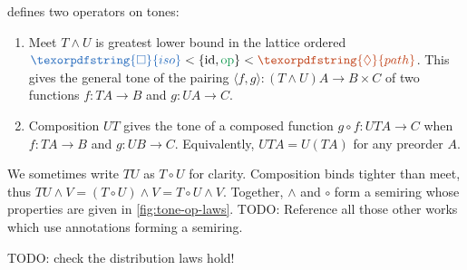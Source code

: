 \documentclass[ribbons]{rntz}
\newcommand{\todo}[1]{{\color{Purple}#1}}
\newcommand{\id}{\ensuremath{\textrm{id}}}
\newcommand{\op}{\ensuremath{\textrm{op}}}
\newcommand{\iso}{\ensuremath{\textrm{iso}}}     %
\renewcommand{\path}{\ensuremath{\textrm{path}}} %
\renewcommand{\iso}{\texorpdfstring{\ensuremath{\Box}}{iso}}
\renewcommand{\path}{\texorpdfstring{\ensuremath{\lozenge}}{path}}
\newcommand{\toneof}[2]{#1 #2}
\newcommand{\tc}{\circ}                      %
\newcommand{\tmeet}{\wedge}                  %
\newcommand{\tm}{\id}                        %
\newcommand{\ta}{{\color{ForestGreen}\op}}   %
\newcommand{\ti}{{\color{NavyBlue}\iso}}     %
\newcommand{\tb}{{\color{Bittersweet}\path}} %
\begin{document}
 defines two operators on tones:
\begin{enumerate}
\item Meet $T \tmeet U$ is greatest lower bound in the lattice ordered $\ti <
  \{\tm, \ta\} < \tb$. This gives the general tone of the pairing $\langle f,
  g\rangle : \toneof{(T \tmeet U)}{A} \to B \times C$ of two functions $f :
  \toneof{T}{A} \to B$ and $g : \toneof{U}{A} \to C$.

\item Composition $UT$ gives the tone of a composed function $g \circ f :
  \toneof{UT}{A} \to C$ when $f : \toneof{T}{A} \to B$ and $g : \toneof{U}{B}
  \to C$. Equivalently, $\toneof{UT}{A} = \toneof{U}{(\toneof{T}{A})}$ for any
  preorder $A$.
\end{enumerate}

We sometimes write $TU$ as $T \tc U$ for clarity. Composition binds tighter than
meet, thus $TU \tmeet V = (T \tc U) \tmeet V = T \tc U \tmeet V$.
%
Together, $\tmeet$ and $\tc$ form a semiring whose properties are given in
\cref{fig:tone-op-laws}. \todo{TODO: Reference all those other works which use
  annotations forming a semiring.}

\todo{TODO: check the distribution laws hold!}
\end{document}
